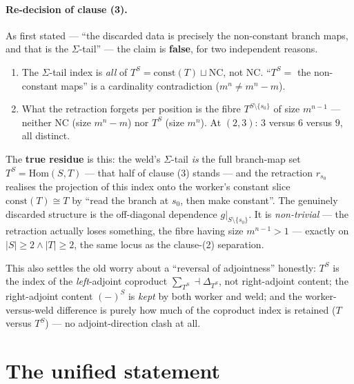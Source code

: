 \documentclass[11pt]{article}
\newcommand{\Hom}{\mathrm{Hom}}
\newcommand{\const}{\mathrm{const}}
\newcommand{\NC}{\mathrm{NC}}
\theoremstyle{plain}
\theoremstyle{definition}
\theoremstyle{remark}
\begin{document}
\paragraph{Re-decision of clause (3).}
As first stated --- ``the discarded data is precisely the non-constant branch maps, and that
is the $\Sigma$-tail'' --- the claim is \textbf{false}, for two independent reasons.
\begin{enumerate}[label=(\roman*),leftmargin=2em]
\item The $\Sigma$-tail index is \emph{all} of $T^S=\const(T)\sqcup\NC$, not $\NC$.
  ``$T^S=$ the non-constant maps'' is a cardinality contradiction ($m^n\ne m^n-m$).
\item What the retraction forgets per position is the fibre $T^{S\setminus\{s_0\}}$ of size
  $m^{n-1}$ --- neither $\NC$ (size $m^n-m$) nor $T^S$ (size $m^n$). At $(2,3)$: $3$ versus
  $6$ versus $9$, all distinct.
\end{enumerate}

\noindent The \textbf{true residue} is this: the weld's $\Sigma$-tail \emph{is} the full
branch-map set $T^S=\Hom(S,T)$ --- that half of clause (3) stands --- and the retraction
$r_{s_0}$ realises the projection of this index onto the worker's constant slice
$\const(T)\cong T$ by ``read the branch at $s_0$, then make constant''. The genuinely
discarded structure is the off-diagonal dependence $g|_{S\setminus\{s_0\}}$. It is
\emph{non-trivial} --- the retraction actually loses something, the fibre having size
$m^{n-1}>1$ --- exactly on $|S|\ge2\wedge|T|\ge2$, the same locus as the clause-(2)
separation.

This also settles the old worry about a ``reversal of adjointness'' honestly: $T^S$ is the
index of the \emph{left}-adjoint coproduct $\sum_{T^S}\dashv\Delta_{T^S}$, not right-adjoint
content; the right-adjoint content $(-)^S$ is \emph{kept} by both worker and weld; and the
worker-versus-weld difference is purely how much of the coproduct index is retained ($T$
versus $T^S$) --- no adjoint-direction clash at all.

\section{The unified statement}\label{sec:unified}
\end{document}
